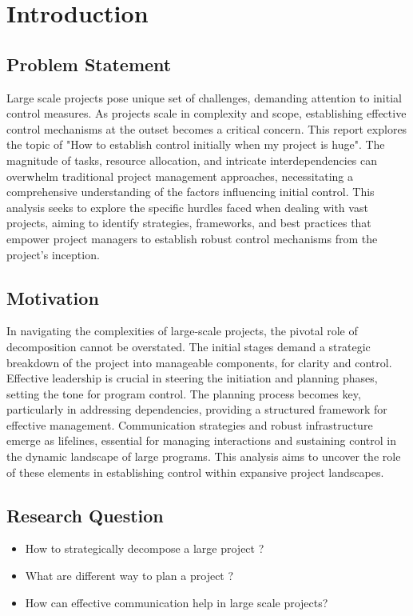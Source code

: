 \documentclass[runningheads]{llncs}
\begin{document}
\section{Introduction}


\subsection{Problem Statement}
Large scale projects pose unique set of challenges, demanding attention to initial control measures. As projects scale in complexity and scope, establishing effective control mechanisms at the outset becomes a critical concern. This report explores the topic of "How to establish control initially when my project is huge". The magnitude of tasks, resource allocation, and intricate interdependencies can overwhelm traditional project management approaches, necessitating a comprehensive understanding of the factors influencing initial control. This analysis seeks to explore the specific hurdles faced when dealing with vast projects, aiming to identify strategies, frameworks, and best practices that empower project managers to establish robust control mechanisms from the project's inception.


\subsection{Motivation}

In navigating the complexities of large-scale projects, the pivotal role of decomposition cannot be overstated. The initial stages demand a strategic breakdown of the project into manageable components, for clarity and control. Effective leadership is crucial in steering the initiation and planning phases, setting the tone for program control. The planning process becomes key, particularly in addressing dependencies, providing a structured framework for effective management. Communication strategies and robust infrastructure emerge as lifelines, essential for managing interactions and sustaining control in the dynamic landscape of large programs. This analysis aims to uncover the role of these elements in establishing control within expansive project landscapes.


\subsection{Research Question}
\begin{itemize}[label=$\bullet$]
    \item How to strategically decompose a large project ? 
    \item What are different way to plan a project ?
    \item How can effective communication help in large scale projects?
\end{itemize}
\end{document}
